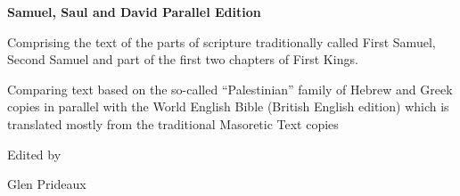 \begin{titlepage}
\thispagestyle{empty}

\vspace*{\fill}

\begin{center}

{\Huge\bfseries Samuel, Saul and David Parallel Edition\par}
\end{center}

\vspace{1.5em}
Comprising the text of the parts of scripture traditionally called First
Samuel, Second Samuel and part of the first two chapters of First Kings.

\vspace{1.5em}
{\Large
Comparing text based on the so-called ``Palestinian'' family of Hebrew and Greek
copies
in parallel with the World English Bible (British English edition) which is translated mostly from the
traditional Masoretic Text copies\par}

\vspace{3em}

\begin{center}
{\large Edited by\par}

\vspace{0.5em}

{\Large Glen Prideaux\par}

\end{center}

\vspace*{\fill}

\end{titlepage}